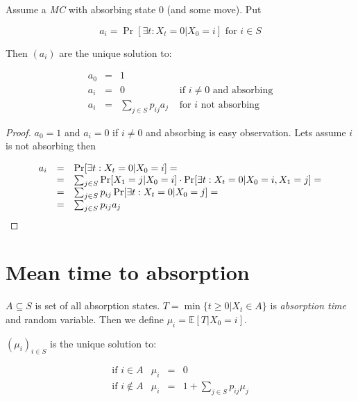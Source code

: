\begin{lemma}
	Assume a \textit{MC} with absorbing state $0$ (and some move). Put
	
	$$
	a_{i} = \Pr[\exists t : X_{t} = 0 \vert X_{0} = i] \text{ for } i \in S
	$$
	
	Then $(a_{i})$ are the unique solution to:
	
	$$
	\begin{array}{rcll}
		a_{0} & = & 1 \\
		a_{i} & = & 0 &\text{ if } i \neq 0 \text{ and absorbing} \\
		a_{i} & = & \sum_{j \in S} p_{ij} a_{j} & \text{ for } i \text{ not absorbing}
	\end{array}
	$$
\end{lemma}

\begin{proof}
	$a_{0} = 1$ and $a_{i} = 0$ if $i \neq 0$ and absorbing is easy observation. Lets assume $i$ is not absorbing then
	
	$$
	\begin{array}{r c l}
		a_{i} & = & \Pr[\exists t : X_{t} = 0 \vert X_{0} = i] = \\
		& = & \sum_{j \in S} \Pr[X_{1} = j \vert X_{0} = i] \cdot \Pr[\exists t : X_{t} = 0 \vert X_{0} = i, X_{1} = j] = \\
		& = & \sum_{j \in S} p_{ij} \Pr[\exists t : X_{t} = 0 \vert X_{0} = j] = \\
		& = & \sum_{j \in S} p_{ij} a_{j} \\
	\end{array}
	$$
\end{proof}

\section{Mean time to absorption}

$A \subseteq S$ is set of all absorption states. $T = \min \{ t \geq 0 \vert X_{t} \in A\}$ is \textit{absorption time} and random variable. Then we define $\mu_{i} = \mathbb{E} [T \vert X_{0} = i]$.

\begin{thm}
	$(\mu_{i})_{i \in S}$ is the unique solution to:
	
	$$
	\begin{array}{rrcl}
		\text{if } i \in A & \mu_{i} & = & 0 \\
		\text{if } i \notin A & \mu_{i} & = &1 + \sum_{j \in S} p_{ij}\mu_{j}
	\end{array}
	$$
\end{thm}

